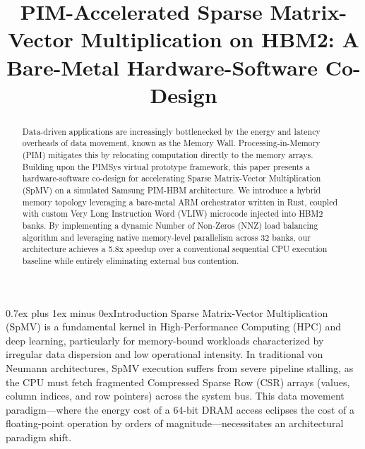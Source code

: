 \documentclass[conference]{IEEEtran}
\makeatletter
\renewcommand{\section}{\@startsection{section}{1}{\z@}{3.0ex plus 1.5ex minus 1.5ex}%
{0.7ex plus 1ex minus 0ex}{\normalfont\normalsize\centering\bfseries\scshape}}
\makeatother
\begin{document}
%
\title{PIM-Accelerated Sparse Matrix-Vector Multiplication on HBM2: A Bare-Metal Hardware-Software Co-Design}

\author{
}

\maketitle

\begin{abstract}
Data-driven applications are increasingly bottlenecked by the energy and latency overheads of data movement, known as the Memory Wall. Processing-in-Memory (PIM) mitigates this by relocating computation directly to the memory arrays. Building upon the PIMSys virtual prototype framework, this paper presents a hardware-software co-design for accelerating Sparse Matrix-Vector Multiplication (SpMV) on a simulated Samsung PIM-HBM architecture. We introduce a hybrid memory topology leveraging a bare-metal ARM orchestrator written in Rust, coupled with custom Very Long Instruction Word (VLIW) microcode injected into HBM2 banks. By implementing a dynamic Number of Non-Zeros (NNZ) load balancing algorithm and leveraging native memory-level parallelism across 32 banks, our architecture achieves a 5.8x speedup over a conventional sequential CPU execution baseline while entirely eliminating external bus contention.
\end{abstract}

\IEEEpeerreviewmaketitle

\section{Introduction}
Sparse Matrix-Vector Multiplication (SpMV) is a fundamental kernel in High-Performance Computing (HPC) and deep learning, particularly for memory-bound workloads characterized by irregular data dispersion and low operational intensity. In traditional von Neumann architectures, SpMV execution suffers from severe pipeline stalling, as the CPU must fetch fragmented Compressed Sparse Row (CSR) arrays (values, column indices, and row pointers) across the system bus. This data movement paradigm—where the energy cost of a 64-bit DRAM access eclipses the cost of a floating-point operation by orders of magnitude—necessitates an architectural paradigm shift.
\end{document}
